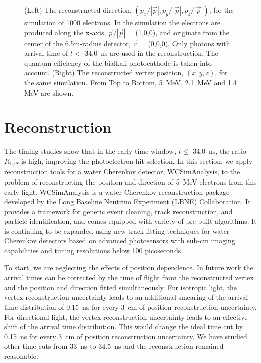 \documentclass[cits]{JINST}
\begin{document}
\begin{figure}[tbh]
\begin{center}
        \caption[]{\label{fig:reco} (Left) The reconstructed direction,
        $(p_x/|\vec{p}|, p_y/|\vec{p}|,
        p_z/|\vec{p}|)$, for the simulation of 1000 electrons. In the simulation the electrons are produced along the
        x-axis, $\vec{p}/|\vec{p}|$ = (1,0,0), and originate
        from the center of the 6.5m-radius detector, $\vec{r}$ =
        (0,0,0). Only photons with arrival time of $t<$ 34.0~ns are used
        in the reconstruction. The quantum efficiency of the bialkali
        photocathode is taken into account. (Right) The reconstructed
        vertex position, $(x,y,z)$, for the same simulation. From Top to Bottom, 5~MeV, 2.1~MeV and 1.4 MeV are shown.}
\end{center}
\end{figure}

\section{Reconstruction}
\label{reconstruction_sec}

The timing studies show that in the early time window, $t\leq$
34.0~ns, the ratio $R_{C/S}$ is high, improving the photoelectron hit selection. In this section, we apply
reconstruction tools for a water Cherenkov detector, WCSimAnalysis,
to the problem of reconstructing the position and direction of 5~MeV
electrons from this early light. WCSimAnalysis is a water Cherenkov
reconstruction package developed by the Long Baseline Neutrino
Experiment (LBNE) Collaboration\cite{Blake}. It provides a framework
for generic event cleaning, track reconstruction, and particle
identification, and comes equipped with variety of pre-built
algorithms. It is continuing to be expanded using new track-fitting
techniques for water Cherenkov detectors\cite{Sanchez2012525} based on
advanced photosensors with sub-cm imaging capabilities and timing
resolutions below 100 picoseconds.

To start, we are neglecting the effects of position dependence. In future work the arrival times can be corrected by the time of flight from the reconstructed vertex and the position and direction fitted simultaneously. For isotropic light, the vertex reconstruction uncertainty leads to an additional smearing of the arrival time distribution of 0.15~ns for every 3~cm of position reconstruction uncertainty. For directional light, the vertex reconstruction uncertainty leads to an effective shift of the arrival time distribution. This would change the ideal time cut by 0.15~ns  for every 3~cm of position reconstruction uncertainty. We have studied other time cuts from 33~ns to 34.5~ns and the reconstruction remained reasonable. 
\end{document}
